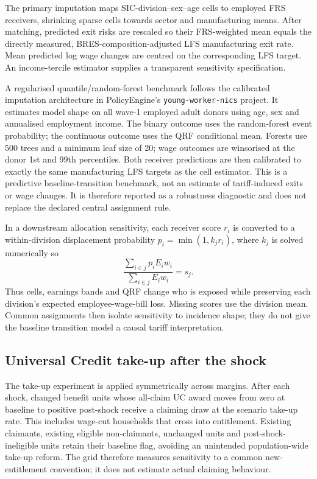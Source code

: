 The primary imputation maps SIC-division--sex--age cells to employed FRS
receivers, shrinking sparse cells towards sector and manufacturing means.
After matching, predicted exit risks are rescaled so their FRS-weighted mean
equals the directly measured, BRES-composition-adjusted LFS manufacturing
exit rate. Mean predicted log wage changes are centred on the corresponding
LFS target. An income-tercile estimator supplies a transparent sensitivity
specification.

A regularised quantile/random-forest benchmark follows the calibrated
imputation architecture in PolicyEngine's \texttt{young-worker-nics}
project. It estimates model shape on all wave-1 employed adult donors using
age, sex and annualised employment income. The binary outcome uses the
random-forest event probability; the continuous outcome uses the QRF
conditional mean. Forests use 500 trees and a minimum leaf size of 20; wage
outcomes are winsorised at the donor 1st and 99th percentiles. Both receiver
predictions are then calibrated to exactly the same manufacturing LFS
targets as the cell estimator. This is a predictive baseline-transition
benchmark, not an estimate of tariff-induced exits or wage changes. It is
therefore reported as a robustness diagnostic and does not replace the
declared central assignment rule.

In a downstream allocation sensitivity, each receiver score $r_i$ is
converted to a within-division displacement probability
$p_i=\min(1,k_jr_i)$, where $k_j$ is solved numerically so
\[
\frac{\sum_{i\in j}p_i E_iw_i}{\sum_{i\in j}E_iw_i}=s_j.
\]
Thus cells, earnings bands and QRF change who is exposed while preserving
each division's expected employee-wage-bill loss. Missing scores use the
division mean. Common assignments then isolate sensitivity to incidence
shape; they do not give the baseline transition model a causal tariff
interpretation.

\subsection{Universal Credit take-up after the shock}\label{sec:method-takeup}

The take-up experiment is applied symmetrically across margins. After each shock, changed benefit units whose all-claim UC award moves from zero at baseline to positive post-shock receive a claiming draw at the scenario take-up rate. This includes wage-cut households that cross into entitlement. Existing claimants, existing eligible non-claimants, unchanged units and post-shock-ineligible units retain their baseline flag, avoiding an unintended population-wide take-up reform. The grid therefore measures sensitivity to a common new-entitlement convention; it does not estimate actual claiming behaviour.

